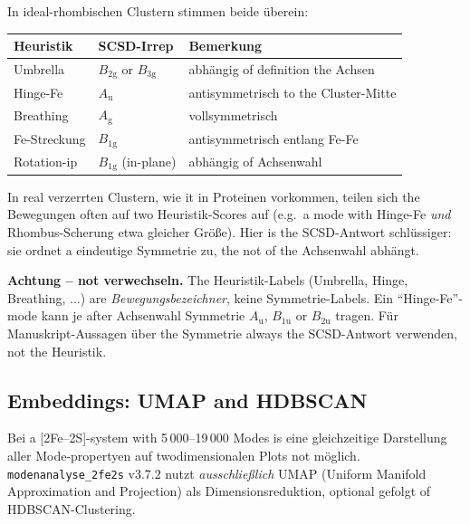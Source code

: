 \documentclass[11pt,a4paper,twoside]{article}
\newcommand{\Ag}{A_{\mathrm{g}}}
\newcommand{\Bgi}[1]{B_{\mathrm{#1g}}}
\newcommand{\Bui}[1]{B_{\mathrm{#1u}}}
\newcommand{\Aui}{A_{\mathrm{u}}}
\theoremstyle{remark}
\begin{document}
In ideal-rhombischen Clustern stimmen beide \"uberein:

\begin{center}
\begin{tabularx}{\textwidth}{l l X}
\toprule
\textbf{Heuristik} & \textbf{SCSD-Irrep} & \textbf{Bemerkung} \\
\midrule
Umbrella     & $\Bgi{2}$ or $\Bgi{3}$ & abh\"angig of definition the Achsen \\
Hinge-Fe     & $\Aui$           & antisymmetrisch to the Cluster-Mitte \\
Breathing    & $\Ag$            & vollsymmetrisch \\
Fe-Streckung & $\Bgi{1}$        & antisymmetrisch entlang Fe-Fe \\
Rotation-ip  & $\Bgi{1}$ (in-plane) & abh\"angig of Achsenwahl \\
\bottomrule
\end{tabularx}
\end{center}

In real verzerrten Clustern, wie it in Proteinen vorkommen, teilen
sich the Bewegungen often auf two Heuristik-Scores auf
(e.g.\ a mode with Hinge-Fe \emph{und} Rhombus-Scherung etwa
gleicher Gr\"o\ss e). Hier is the SCSD-Antwort schl\"ussiger: sie
ordnet a eindeutige Symmetrie zu, the not of the Achsenwahl
abh\"angt.

\begin{warnbox}
\textbf{Achtung -- not verwechseln.} The Heuristik-Labels (Umbrella,
Hinge, Breathing, ...) are \emph{Bewegungsbezeichner}, keine
Symmetrie-Labels. Ein "`Hinge-Fe"'-mode kann je after Achsenwahl
Symmetrie $\Aui$, $\Bui{1}$ or $\Bui{2}$ tragen. F\"ur
Manuskript-Aussagen \"uber the Symmetrie always the SCSD-Antwort
verwenden, not the Heuristik.
\end{warnbox}

\subsection{Embeddings: UMAP and HDBSCAN}
\label{sec:embeddings}

Bei a [2Fe--2S]-system with 5\,000--19\,000 Modes is eine
gleichzeitige Darstellung aller Mode-propertyen auf
twodimensionalen Plots not m\"oglich. \texttt{modenanalyse\_2fe2s}
v3.7.2 nutzt \emph{ausschlie\ss lich} UMAP (Uniform Manifold
Approximation and Projection) als Dimensionsreduktion, optional
gefolgt of HDBSCAN-Clustering.
\end{document}
